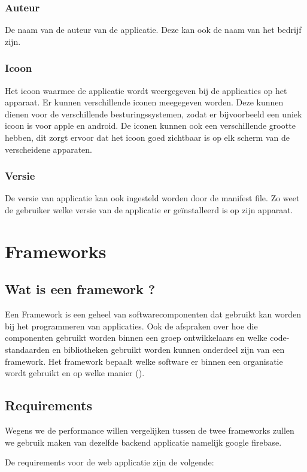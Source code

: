 \subsubsection{Auteur}
De naam van de auteur van de applicatie. Deze kan ook de naam van het bedrijf zijn.

\subsubsection{Icoon}
Het icoon waarmee de applicatie wordt weergegeven bij de applicaties op het apparaat. Er kunnen verschillende iconen meegegeven worden. Deze kunnen dienen voor de verschillende besturingssystemen, zodat er bijvoorbeeld een uniek icoon is voor apple en android. De iconen kunnen ook een verschillende grootte hebben, dit zorgt ervoor dat het icoon goed zichtbaar is op elk scherm van de verscheidene apparaten.

\subsubsection{Versie}
De versie van applicatie kan ook ingesteld worden door de manifest file. Zo weet de gebruiker welke versie van de applicatie er geïnstalleerd is op zijn apparaat.

\section{Frameworks}
\subsection{Wat is een framework ?}
Een Framework is een geheel van softwarecomponenten dat gebruikt kan worden bij het programmeren van applicaties. Ook de afspraken over hoe die componenten gebruikt worden binnen een groep ontwikkelaars en welke code-standaarden en bibliotheken gebruikt worden kunnen onderdeel zijn van een framework. Het framework bepaalt welke software er binnen een organisatie wordt gebruikt en op welke manier (\cite{WIKI_FRAMEWORK}).

\subsection{Requirements}
Wegens we de performance willen vergelijken tussen de twee frameworks zullen we gebruik maken van dezelfde backend applicatie namelijk google firebase.

De requirements voor de web applicatie zijn de volgende:

